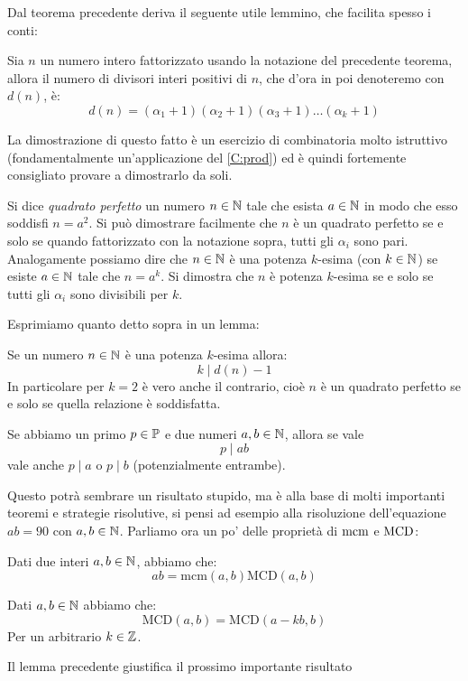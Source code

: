 \documentclass[11pt]{scrartcl}
\begin{document}
	Dal teorema precedente deriva il seguente utile lemmino, che facilita spesso i conti:
	
	\begin{lemma}
		Sia $n$ un numero intero fattorizzato usando la notazione del precedente teorema, allora il numero di divisori interi positivi di $n$, che d'ora in poi denoteremo con $d(n)$, è:
		$$d(n)=(\alpha_1+1)(\alpha_2+1)(\alpha_3+1)\dots(\alpha_k+1)$$
	\end{lemma}
	
	La dimostrazione di questo fatto è un esercizio di combinatoria molto istruttivo (fondamentalmente un'applicazione del \cref{C:prod}) ed è quindi fortemente consigliato provare a dimostrarlo da soli.
	
	\begin{definition}
		Si dice \textit{quadrato perfetto} un numero $n\in\mathbb N$ tale che esista $a\in\mathbb N$ in modo che esso soddisfi $n=a^2$.
		Si può dimostrare facilmente che $n$ è un quadrato perfetto se e solo se quando fattorizzato con la notazione sopra, tutti gli $\alpha_i$ sono pari. \\ 
		Analogamente possiamo dire che $n\in\mathbb N$ è una potenza $k$-esima (con $k\in\mathbb N$) se esiste $a\in\mathbb N$ tale che $n=a^k$. Si dimostra che $n$ è potenza $k$-esima se e solo se tutti gli $\alpha_i$ sono divisibili per $k$.
	\end{definition}
	Esprimiamo quanto detto sopra in un lemma:
	\begin{lemma}
		Se un numero $n\in\mathbb N$ è una potenza $k$-esima allora:
		$$k \mid d(n)-1$$
		In particolare per $k=2$ è vero anche il contrario, cioè $n$ è un quadrato perfetto se e solo se quella relazione è soddisfatta.
	\end{lemma}
	
	\begin{lemma}[Euclide]
		Se abbiamo un primo $p\in\mathbb P$ e due numeri $a,b\in\mathbb N$, allora se vale 
		$$p\mid ab$$ 
		vale anche $p\mid a$ o $p \mid b$ (potenzialmente entrambe).
	\end{lemma}
	Questo potrà sembrare un risultato stupido, ma è alla base di molti importanti teoremi e strategie risolutive, si pensi ad esempio alla risoluzione dell'equazione $ab=90$ con $a,b\in\mathbb N$.
	Parliamo ora un po' delle proprietà di $\text{mcm}$ e $\text{MCD}$:
	\begin{lemma}
		Dati due interi $a,b \in \mathbb N$, abbiamo che:
		$$ab=\text{mcm}(a,b)\text{MCD}(a,b)$$
	\end{lemma}
	\begin{lemma}
		Dati $a,b \in \mathbb N$ abbiamo che:
		$$\text{MCD}(a,b)=\text{MCD}(a-kb,b)$$
		Per un arbitrario $k\in \mathbb Z$. 
	\end{lemma}
	\newpage
	Il lemma precedente giustifica il prossimo importante risultato
	
\end{document}
